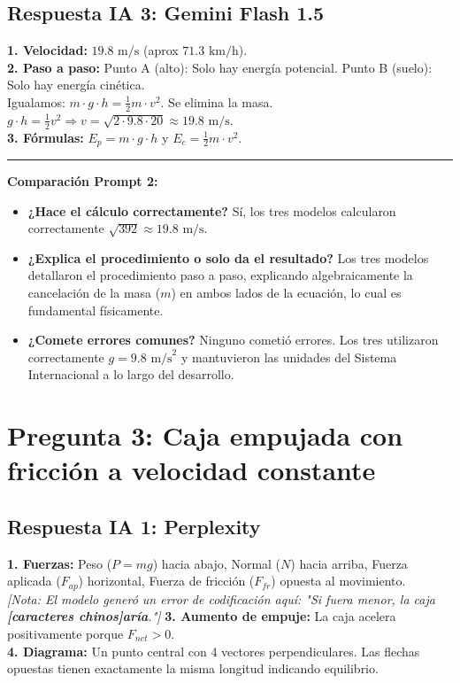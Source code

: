 \documentclass[11pt]{article}
\begin{document}
\subsection*{Respuesta IA 3: Gemini Flash 1.5}
\textbf{1. Velocidad:} $19.8 \text{ m/s}$ (aprox $71.3 \text{ km/h}$). \\
\textbf{2. Paso a paso:}
Punto A (alto): Solo hay energía potencial. Punto B (suelo): Solo hay energía cinética. \\
Igualamos: $m \cdot g \cdot h = \frac{1}{2} m \cdot v^2$. Se elimina la masa. \\
$g \cdot h = \frac{1}{2}v^2 \Rightarrow v = \sqrt{2 \cdot 9.8 \cdot 20} \approx 19.8 \text{ m/s}$. \\
\textbf{3. Fórmulas:} $E_p = m \cdot g \cdot h$ y $E_c = \frac{1}{2} m \cdot v^2$.

\vspace{0.5cm}
\hrule
\vspace{0.3cm}
\textbf{Comparación Prompt 2:}
\begin{itemize}
	\item \textbf{¿Hace el cálculo correctamente?} Sí, los tres modelos calcularon correctamente $\sqrt{392} \approx 19.8 \text{ m/s}$.
	\item \textbf{¿Explica el procedimiento o solo da el resultado?} Los tres modelos detallaron el procedimiento paso a paso, explicando algebraicamente la cancelación de la masa ($m$) en ambos lados de la ecuación, lo cual es fundamental físicamente.
	\item \textbf{¿Comete errores comunes?} Ninguno cometió errores. Los tres utilizaron correctamente $g = 9.8 \text{ m/s}^2$ y mantuvieron las unidades del Sistema Internacional a lo largo del desarrollo.
\end{itemize}

\newpage
\section*{Pregunta 3: Caja empujada con fricción a velocidad constante}

\subsection*{Respuesta IA 1: Perplexity}
\textbf{1. Fuerzas:} Peso ($P = mg$) hacia abajo, Normal ($N$) hacia arriba, Fuerza aplicada ($F_{ap}$) horizontal, Fuerza de fricción ($F_{fr}$) opuesta al movimiento. \\
\textit{[Nota: El modelo generó un error de codificación aquí: "Si fuera menor, la caja \textbf{[caracteres chinos]aría}."]}
\textbf{3. Aumento de empuje:} La caja acelera positivamente porque $F_{net} > 0$. \\
\textbf{4. Diagrama:} Un punto central con 4 vectores perpendiculares. Las flechas opuestas tienen exactamente la misma longitud indicando equilibrio.
\end{document}
